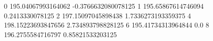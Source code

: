 0 195.04067993164062 -0.3766632080078125
1 195.65867614746094 0.2413330078125
2 197.15097045898438 1.7336273193359375
4 198.15223693847656 2.734893798828125
6 195.41734313964844 0.0
8 196.2755584716797 0.85821533203125
